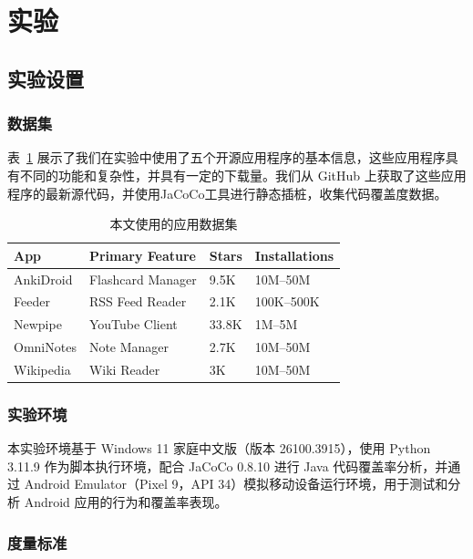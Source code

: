 \documentclass[twocolumn, 10pt]{article}
\begin{document}
\section{实验}

\subsection{实验设置}
\label{sec:setup}

\subsubsection{数据集}

表~\ref{tab:app-dataset} 展示了我们在实验中使用了五个开源应用程序的基本信息，这些应用程序具有不同的功能和复杂性，并具有一定的下载量。我们从 GitHub 上获取了这些应用程序的最新源代码，并使用JaCoCo\cite{jacoco}工具进行静态插桩，收集代码覆盖度数据。

\begin{table}[t]
\small
\centering
\caption{本文使用的应用数据集}
\label{tab:app-dataset}
\begin{tabular}{@{}llll@{}}
\toprule
\textbf{App}    & \textbf{Primary Feature}        & \textbf{Stars} & \textbf{Installations} \\ 
\midrule
AnkiDroid   & Flashcard Manager     & 9.5K         & 10M–50M       \\
Feeder      & RSS Feed Reader        & 2.1K         & 100K–500K     \\
Newpipe     & YouTube Client         & 33.8K        & 1M–5M         \\
OmniNotes   & Note Manager           & 2.7K         & 10M–50M       \\
Wikipedia   & Wiki Reader    & 3K           & 10M–50M       \\
\bottomrule
\end{tabular}
\end{table}


\subsubsection{实验环境}

本实验环境基于 Windows 11 家庭中文版（版本 26100.3915），使用 Python 3.11.9 作为脚本执行环境，配合 JaCoCo 0.8.10 进行 Java 代码覆盖率分析，并通过 Android Emulator（Pixel 9，API 34）模拟移动设备运行环境，用于测试和分析 Android 应用的行为和覆盖率表现。

\subsubsection{度量标准}
\label{sec:metrics}
\end{document}
